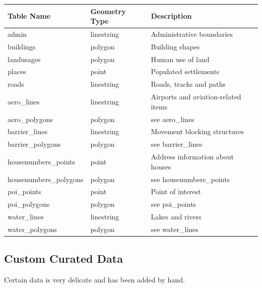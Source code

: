 \begin{flushleft}
    \begin{tabular}{lll}
    \hline
    Table Name            & Geometry Type & Description \\
    \hline                                          
    admin                  & linestring    & Administrative boundaries \\
    buildings              & polygon       & Building shapes                            \\
    landusages             & polygon       & Human use of land \\
    places                 & point         & Populated settlements                      \\
    roads                  & linestring    & Roads, tracks and paths          \\
    aero\_lines            & linestring    & Airports and aviation-related items        \\
    aero\_polygons         & polygon       & see aero\_lines                            \\
    barrier\_lines         & linestring    & Movement blocking structures   \\
    barrier\_polygons      & polygon       & see barrier\_lines                         \\
    housenumbers\_points   & point         & Address information about houses \\
    housenumbers\_polygons & polygon       & see housenumbers\_points                   \\
    poi\_points            & point         & Point of interest                          \\
    poi\_polygons          & polygon       & see poi\_points                            \\
    water\_lines           & linestring    & Lakes and rivers                           \\
    water\_polygons        & polygon       & see water\_lines                           \\
    \end{tabular}
\end{flushleft}

\subsection{Custom Curated Data}

Certain data is very delicate and has been added by hand.

